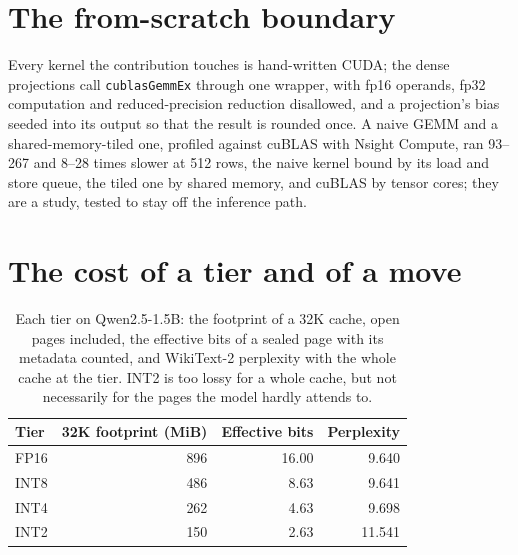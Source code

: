 \documentclass{article}
\begin{document}
\section{The from-scratch boundary}
\label{app:boundary}

Every kernel the contribution touches is hand-written CUDA; the dense
projections call \texttt{cublasGemmEx} through one wrapper, with fp16 operands,
fp32 computation and reduced-precision reduction disallowed, and a projection's
bias seeded into its output so that the result is rounded once. A naive GEMM
and a shared-memory-tiled one, profiled against cuBLAS with Nsight Compute,
ran 93--267 and 8--28 times slower at 512 rows, the naive kernel bound by its
load and store queue, the tiled one by shared memory, and cuBLAS by tensor
cores; they are a study, tested to stay off the inference path.

\section{The cost of a tier and of a move}
\label{app:moves}

\begin{table}[h]
\caption{Each tier on Qwen2.5-1.5B: the footprint of a 32K cache, open pages
included, the effective bits of a sealed page with its metadata counted, and
WikiText-2 perplexity with the whole cache at the tier. INT2 is too lossy for a whole cache, but not necessarily for the pages
the model hardly attends to.}
\label{tab:tiers}
\centering
\small
\begin{tabular}{lrrr}
\toprule
Tier & 32K footprint (MiB) & Effective bits & Perplexity \\
\midrule
FP16 & 896 & 16.00 & 9.640 \\
INT8 & 486 & 8.63 & 9.641 \\
INT4 & 262 & 4.63 & 9.698 \\
INT2 & 150 & 2.63 & 11.541 \\
\bottomrule
\end{tabular}
\end{table}
\end{document}
